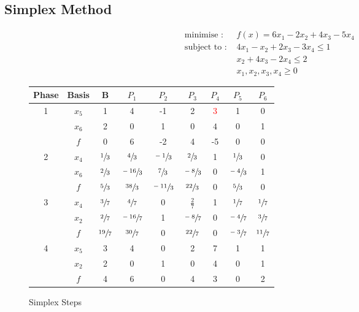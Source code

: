 \subsection{Simplex Method}
\begin{align*}
\text{ minimise : } & f(x) = 6x_1 - 2x_2 +4x_3 - 5x_4\\
\text{ subject to : } & 4x_1 - x_2 + 2x_3 - 3x_4 \le 1 \\
& x_2 + 4x_3 - 2x_4 \le 2 \\
& x_1,x_2,x_3,x_4 \ge 0
\end{align*}
\begin{figure}[hbt]
\centering
\begin{tabular}{c|c|c|c|c|c|c|c|c|}\hline
Phase & Basis & B & $P_1$ & $P_2$ & $P_3$ & $P_4$ & $P_5$ & $P_6$ \\ \hline
1 & $x_5$ & 1 & 4 & -1 & 2 & \textcolor{red}{$3$} & 1 & 0  \\ 
  & $x_6$ & 2 & 0 &  1 & 0 & $4$ & 0 & 1 \\ \hline
  & $f$   & 0 & 6 & -2 & 4 & -5 & 0 & 0 \\ \hline
	2 & $x_4$ & $\sfrac{1}{3}$ & $\sfrac{4}{3}$ & $\sfrac{-1}{3}$ & $\sfrac{2}{3}$ & 1 & $\sfrac{1}{3}$ & 0  \\ 
	& $x_6$ & $\sfrac{2}{3}$ & $\sfrac{-16}{3}$ & \textcolor{red}{$\sfrac{7}{3}$} & $\sfrac{-8}{3}$ & 0 & $\sfrac{-4}{3}$ & 1 \\ \hline
	& $f$ & $\sfrac{5}{3}$ & $\sfrac{38}{3}$ & $\sfrac{-11}{3}$ & $\sfrac{22}{3}$ & 0 & $\sfrac{5}{3}$ & 0 \\ \hline
	3 & $x_4$ & $\sfrac{3}{7}$ & $\sfrac{4}{7}$ & 0 & $\frac{2}{7}$ & 1 & \textcolor{red}{$\sfrac{1}{7}$} & $\sfrac{1}{7}$  \\ 
	& $x_2$ & $\sfrac{2}{7}$ & $\sfrac{-16}{7}$ & 1 & $\sfrac{-8}{7}$ & 0 & $\sfrac{-4}{7}$ & $\sfrac{3}{7}$ \\ \hline
	& $f$ & $\sfrac{19}{7}$ & $\sfrac{30}{7}$ & 0 & $\sfrac{22}{7}$ & 0 & $\sfrac{-3}{7}$ & $\sfrac{11}{7}$ \\ \hline
	4 & $x_5$ & 3 & 4 & 0 & 2 & 7 & 1 & 1 \\
	  & $x_2$ & 2 & 0 & 1 & 0 & 4 & 0 & 1 \\ \hline
	  & $f$   & 4 & 6 & 0 & 4 & 3 & 0 & 2 \\ \hline
\end{tabular}
\caption{Simplex Steps}
\end{figure}

